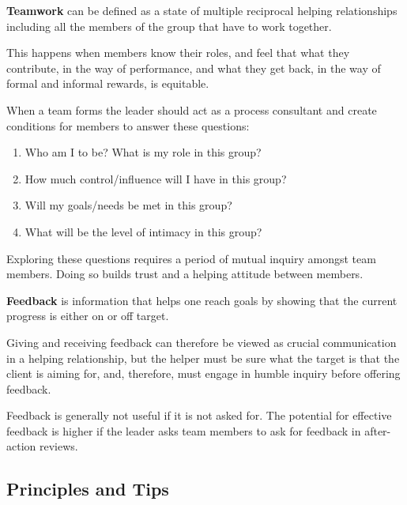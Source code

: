 \documentclass{article}
\newenvironment{nosepenumerate}
{ \begin{enumerate}
    \setlength{\itemsep}{0pt}
    \setlength{\parskip}{0pt}
    \setlength{\parsep}{0pt}     }
{ \end{enumerate}                  }
\begin{document}
\begin{multicols}{2}

\noindent
\textbf{Teamwork} can be defined as a state of multiple reciprocal helping relationships including all the members of the group that have to work together.

This happens when members know their roles, and feel that what they contribute, in the way of performance, and what they get back, in the way of formal and informal rewards, is equitable.

When a team forms the leader should act as a process consultant and create conditions for members to answer these questions:

\begin{nosepenumerate}
    \item Who am I to be? What is my role in this group?
    \item How much control/influence will I have in this group?
    \item Will my goals/needs be met in this group?
    \item What will be the level of intimacy in this group?
\end{nosepenumerate}

Exploring these questions requires a period of mutual inquiry amongst team members. Doing so builds trust and a helping attitude between members.

\textbf{Feedback} is information that helps one reach goals by showing that the current progress is either on or off target.

Giving and receiving feedback can therefore be viewed as crucial communication in a helping relationship, but the helper must be sure what the target is that the client is aiming for, and, therefore, must engage in humble inquiry before offering feedback.

Feedback is generally not useful if it is not asked for. The potential for effective feedback is higher if the leader asks team members to ask for feedback in after-action reviews.

\end{multicols}

\begin{center}
\section{Principles and Tips}
\end{center}
\end{document}
